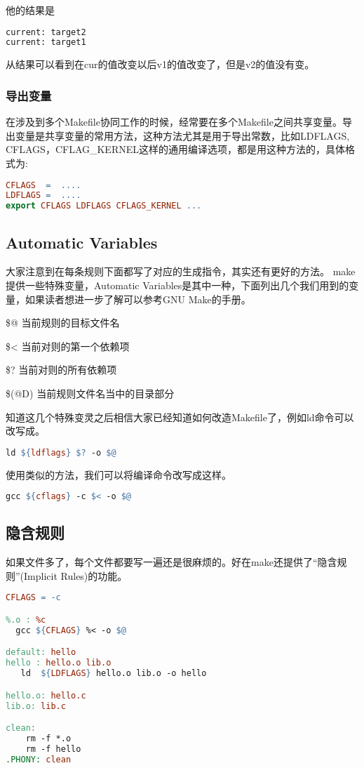 他的结果是
\begin{lstlisting}[language=bash]
current: target2
current: target1
\end{lstlisting}
从结果可以看到在cur的值改变以后v1的值改变了，但是v2的值没有变。

\subsubsection{导出变量}
在涉及到多个Makefile协同工作的时候，经常要在多个Makefile之间共享变量。导出变量是共享变量的常用方法，这种方法尤其是用于导出常数，比如LDFLAGS, CFLAGS，CFLAG\_KERNEL这样的通用编译选项，都是用这种方法的，具体格式为:
\begin{lstlisting}[language=make]
CFLAGS  =  ....
LDFLAGS =  ....
export CFLAGS LDFLAGS CFLAGS_KERNEL ...
\end{lstlisting}

\subsection{Automatic Variables}
大家注意到在每条规则下面都写了对应的生成指令，其实还有更好的方法。
make提供一些特殊变量，Automatic Variables是其中一种，下面列出几个我们用到的变量，如果读者想进一步了解可以参考GNU Make的手册。
\begin{compactenum}
\item \$@    当前规则的目标文件名
\item \$<    当前对则的第一个依赖项
\item \$?    当前对则的所有依赖项
\item \$(@D) 当前规则文件名当中的目录部分
\end{compactenum}
知道这几个特殊变灵之后相信大家已经知道如何改造Makefile了，例如ld命令可以改写成。
\begin{lstlisting}[language=make]
ld ${ldflags} $? -o $@
\end{lstlisting}
使用类似的方法，我们可以将编译命令改写成这样。
\begin{lstlisting}[language=make]
gcc ${cflags} -c $< -o $@
\end{lstlisting}

\subsection{隐含规则}
如果文件多了，每个文件都要写一遍还是很麻烦的。好在make还提供了“隐含规则”(Implicit Rules)的功能。
\begin{lstlisting}[language=make]
CFLAGS = -c

%.o : %c
  gcc ${CFLAGS} %< -o $@

default: hello
hello : hello.o lib.o
   ld  ${LDFLAGS} hello.o lib.o -o hello

hello.o: hello.c
lib.o: lib.c

clean:
    rm -f *.o
    rm -f hello
.PHONY: clean
\end{lstlisting}

